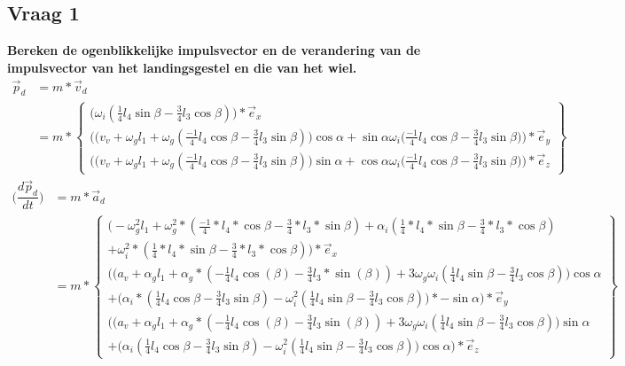 \documentclass[a4paper,10pt]{article}
\begin{document}
\subsection{Vraag 1}
\textbf{Bereken de ogenblikkelijke impulsvector en de verandering van de impulsvector van het landingsgestel en die van het wiel.}\\
\begin{equation}
\begin{aligned}
\vec{p}_d &= m *\vec{v}_d \\
&= m * \begin{Bmatrix}
\Big(\omega_i  (\frac{1}{4}l_4 \sin{\beta}-\frac{3}{4}l_3  \cos{\beta})\Big) * \vec{e}_{x}\\
\Big(\big(v_v + \omega_g  l_1 + \omega_g(\frac{-1}{4} l_4 \cos{\beta}-\frac{3}{4} l_3 \sin{\beta}) \big) \cos{\alpha}  + \sin{\alpha}  \omega_i  \big( \frac{-1}{4}l_4 \cos{\beta} - \frac{3}{4}l_3 \sin{\beta}\big)\Big)*\vec{e}_{y} \\
\Big(\big(v_v + \omega_g   l_1 + \omega_g (\frac{-1}{4} l_4 \cos{\beta}-\frac{3}{4} l_3 \sin{\beta}) \big) \sin{\alpha}  + \cos{\alpha}  \omega_i   \big( \frac{-1}{4} l_4 \cos{\beta} - \frac{3}{4}l_3 \sin{\beta}\big)\Big)*\vec{e}_{z}
\end{Bmatrix}
\end{aligned}
\end{equation} 
\begin{equation}
\begin{aligned}
	\big(\dfrac{d\vec{p}_d}{dt}\big) &= m *\vec{a}_d\\
	&= m * \begin{Bmatrix}
	\Big( -\omega^{2}_g l_1 +\omega_{g}^{2} * (\frac{-1}{4}*l_4*\cos{\beta}-\frac{3}{4}*l_3*\sin{\beta})+\alpha_i(\frac{1}{4}*l_4 *\sin{\beta}-\frac{3}{4}*l_3 * \cos{\beta})\\ + \omega_i^2*(\frac{1}{4}*l_4 *\sin{\beta}-\frac{3}{4}*l_3 * \cos{\beta}) \Big)* \vec{e}_{x}\\
	\Bigg(\Big(a_v +\alpha_g l_1 +\alpha_g *({-\frac{1}{4}}  l_4 \cos(\beta)-\frac{3}{4}l_3*\sin(\beta)) + 3\omega_g\omega_i(\frac{1}{4}l_4 \sin{\beta}-\frac{3}{4}l_3  \cos{\beta})\Big)\cos{\alpha}\\ + \Big(\alpha_i * (\frac{1}{4} l_4 \cos{\beta} - \frac{3}{4} l_3 \sin{\beta}) - \omega_i^2(\frac{1}{4} l_4 \sin{\beta}-\frac{3}{4} l_3  \cos{\beta})\Big)*-\sin{\alpha}\Bigg)*\vec{e}_{y}\\
	\Bigg(\Big(a_v +\alpha_g l_1 +\alpha_g *({-\frac{1}{4}}  l_4 \cos(\beta)-\frac{3}{4}l_3 \sin(\beta)) + 3\omega_g\omega_i(\frac{1}{4}l_4 \sin{\beta}-\frac{3}{4}l_3  \cos{\beta})\Big)\sin{\alpha}\\ + \Big(\alpha_i (\frac{1}{4} l_4 \cos{\beta} - \frac{3}{4} l_3 \sin{\beta}) - \omega_i^2(\frac{1}{4} l_4 \sin{\beta}-\frac{3}{4} l_3   \cos{\beta})\Big) \cos{\alpha}\Bigg)*\vec{e}_{z}
	\end{Bmatrix}
\end{aligned}
\end{equation}
\end{document}
